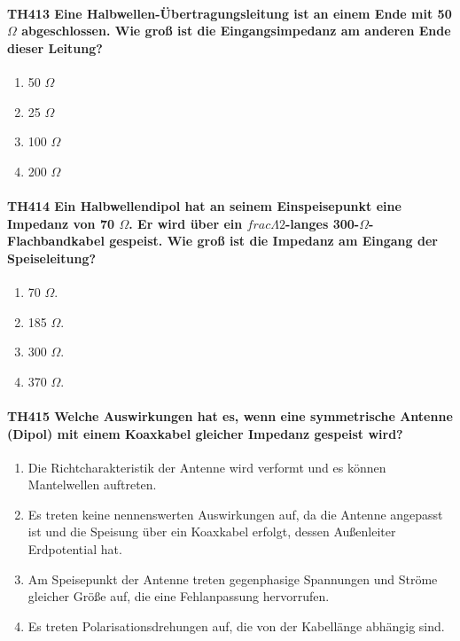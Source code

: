 \documentclass[8pt]{article}
\begin{document}
\paragraph*{TH413 Eine Halbwellen-Übertragungsleitung ist an einem Ende mit 50 $\Omega$ abgeschlossen. Wie groß ist die Eingangsimpedanz am anderen Ende dieser Leitung?}
\begin{enumerate}[nolistsep,label=\Alph*]
\item 50 $\Omega$
\item 25 $\Omega$
\item 100 $\Omega$
\item 200 $\Omega$
\end{enumerate}

\paragraph*{TH414 Ein Halbwellendipol hat an seinem Einspeisepunkt eine Impedanz von 70 $\Omega$. Er wird über ein $frac{\Lambda}{2}$-langes 300-$\Omega$-Flachbandkabel gespeist. Wie groß ist die Impedanz am Eingang der Speiseleitung?}
\begin{enumerate}[nolistsep,label=\Alph*]
\item 70 $\Omega$.
\item 185 $\Omega$.
\item 300 $\Omega$.
\item 370 $\Omega$.
\end{enumerate}

\paragraph*{TH415 Welche Auswirkungen hat es, wenn eine symmetrische Antenne (Dipol) mit einem Koaxkabel gleicher Impedanz gespeist wird?}
\begin{enumerate}[nolistsep,label=\Alph*]
\item Die Richtcharakteristik der Antenne wird verformt und es können Mantelwellen auftreten. 
\item Es treten keine nennenswerten Auswirkungen auf, da die Antenne angepasst ist und die Speisung über ein Koaxkabel erfolgt, dessen Außenleiter Erdpotential hat.
\item Am Speisepunkt der Antenne treten gegenphasige Spannungen und Ströme gleicher Größe auf, die eine Fehlanpassung hervorrufen.
\item Es treten Polarisationsdrehungen auf, die von der Kabellänge abhängig sind.
\end{enumerate}
\end{document}

